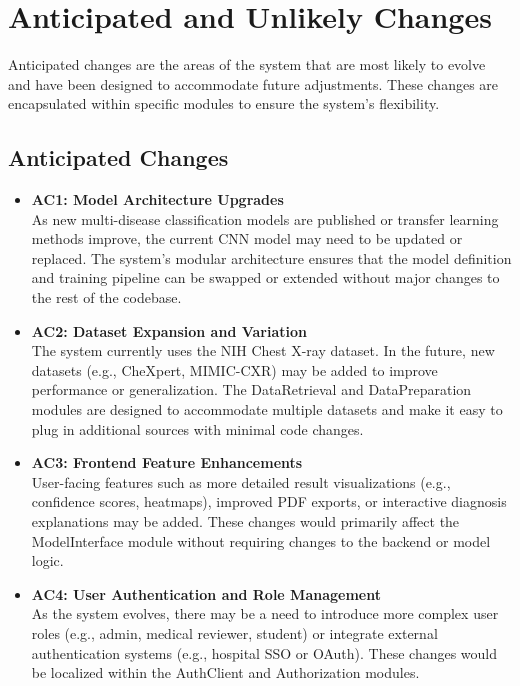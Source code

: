\documentclass[12pt, titlepage]{article}
\begin{document}
\newpage

\section{Anticipated and Unlikely Changes}

Anticipated changes are the areas of the system that are most likely to evolve and have been designed to accommodate future adjustments. These changes are encapsulated within specific modules to ensure the system's flexibility.

\subsection{Anticipated Changes}

\begin{itemize}
    \item \textbf{AC1: Model Architecture Upgrades} \\
    As new multi-disease classification models are published or transfer learning methods improve, the current CNN model may need to be updated or replaced. The system's modular architecture ensures that the model definition and training pipeline can be swapped or extended without major changes to the rest of the codebase.
    
    \item \textbf{AC2: Dataset Expansion and Variation} \\
    The system currently uses the NIH Chest X-ray dataset. In the future, new datasets (e.g., CheXpert, MIMIC-CXR) may be added to improve performance or generalization. The DataRetrieval and DataPreparation modules are designed to accommodate multiple datasets and make it easy to plug in additional sources with minimal code changes.
    
    \item \textbf{AC3: Frontend Feature Enhancements} \\
    User-facing features such as more detailed result visualizations (e.g., confidence scores, heatmaps), improved PDF exports, or interactive diagnosis explanations may be added. These changes would primarily affect the ModelInterface module without requiring changes to the backend or model logic.
    
    \item \textbf{AC4: User Authentication and Role Management} \\
    As the system evolves, there may be a need to introduce more complex user roles (e.g., admin, medical reviewer, student) or integrate external authentication systems (e.g., hospital SSO or OAuth). These changes would be localized within the AuthClient and Authorization modules.
    

\end{itemize}
\end{document}
